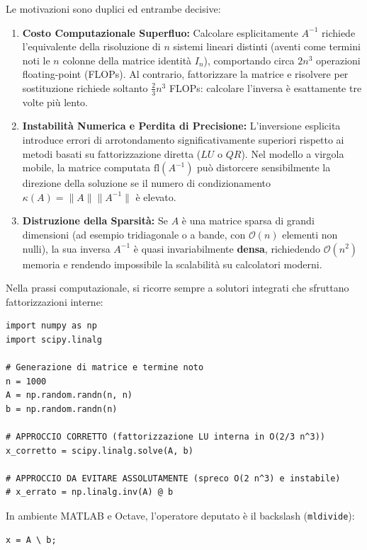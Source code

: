 Le motivazioni sono duplici ed entrambe decisive:
\begin{enumerate}
    \item \textbf{Costo Computazionale Superfluo:} Calcolare esplicitamente $A^{-1}$ richiede l'equivalente della risoluzione di $n$ sistemi lineari distinti (aventi come termini noti le $n$ colonne della matrice identit\`a $I_n$), comportando circa $2n^3$ operazioni floating-point (FLOPs). Al contrario, fattorizzare la matrice e risolvere per sostituzione richiede soltanto $\frac{2}{3}n^3$ FLOPs: calcolare l'inversa \`e esattamente tre volte pi\`u lento.
    \item \textbf{Instabilit\`a Numerica e Perdita di Precisione:} L'inversione esplicita introduce errori di arrotondamento significativamente superiori rispetto ai metodi basati su fattorizzazione diretta ($LU$ o $QR$). Nel modello a virgola mobile, la matrice computata $\mathrm{fl}(A^{-1})$ pu\`o distorcere sensibilmente la direzione della soluzione se il numero di condizionamento $\kappa(A) = \|A\| \|A^{-1}\|$ \`e elevato.
    \item \textbf{Distruzione della Sparsit\`a:} Se $A$ \`e una matrice sparsa di grandi dimensioni (ad esempio tridiagonale o a bande, con $\mathcal{O}(n)$ elementi non nulli), la sua inversa $A^{-1}$ \`e quasi invariabilmente \textbf{densa}, richiedendo $\mathcal{O}(n^2)$ memoria e rendendo impossibile la scalabilit\`a su calcolatori moderni.
\end{enumerate}

Nella prassi computazionale, si ricorre sempre a solutori integrati che sfruttano fattorizzazioni interne:
\begin{lstlisting}[style=pythoncode, caption={Risoluzione corretta in Python mediante SciPy e confronto concettuale.}, label={lst:scipy-solve}]
import numpy as np
import scipy.linalg

# Generazione di matrice e termine noto
n = 1000
A = np.random.randn(n, n)
b = np.random.randn(n)

# APPROCCIO CORRETTO (fattorizzazione LU interna in O(2/3 n^3))
x_corretto = scipy.linalg.solve(A, b)

# APPROCCIO DA EVITARE ASSOLUTAMENTE (spreco O(2 n^3) e instabile)
# x_errato = np.linalg.inv(A) @ b
\end{lstlisting}

In ambiente MATLAB e Octave, l'operatore deputato \`e il backslash (\texttt{mldivide}):
\begin{lstlisting}[style=code, caption={Sintassi standard in MATLAB/Octave.}, label={lst:matlab-backslash}]
% Operatore mldivide: determina automaticamente la fattorizzazione ottimale
x = A \ b;
\end{lstlisting}


